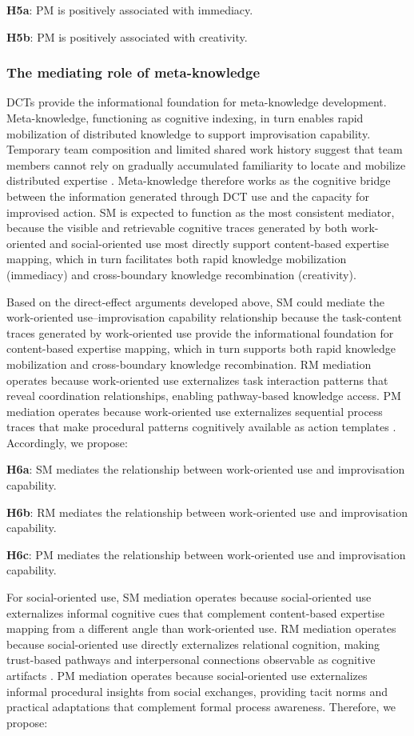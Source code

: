 \documentclass[authoryear,preprint,review,times,10pt]{elsarticle}
\begin{document}
\textbf{H5a}: PM is positively associated with immediacy.

\textbf{H5b}: PM is positively associated with creativity.

\subsubsection{The mediating role of meta-knowledge}
DCTs provide the informational foundation for meta-knowledge development. Meta-knowledge, functioning as cognitive indexing, in turn enables rapid mobilization of distributed knowledge to support improvisation capability. Temporary team composition and limited shared work history suggest that team members cannot rely on gradually accumulated familiarity to locate and mobilize distributed expertise \citep{jiang2025Confronting}. Meta-knowledge therefore works as the cognitive bridge between the information generated through DCT use and the capacity for improvised action. SM is expected to function as the most consistent mediator, because the visible and retrievable cognitive traces generated by both work-oriented and social-oriented use most directly support content-based expertise mapping, which in turn facilitates both rapid knowledge mobilization (immediacy) and cross-boundary knowledge recombination (creativity).

Based on the direct-effect arguments developed above, SM could mediate the work-oriented use--improvisation capability relationship because the task-content traces generated by work-oriented use provide the informational foundation for content-based expertise mapping, which in turn supports both rapid knowledge mobilization and cross-boundary knowledge recombination. RM mediation operates because work-oriented use externalizes task interaction patterns that reveal coordination relationships, enabling pathway-based knowledge access. PM mediation operates because work-oriented use externalizes sequential process traces that make procedural patterns cognitively available as action templates \citep{zhang2018Mobile}. Accordingly, we propose:

\textbf{H6a}: SM mediates the relationship between work-oriented use and improvisation capability.

\textbf{H6b}: RM mediates the relationship between work-oriented use and improvisation capability.

\textbf{H6c}: PM mediates the relationship between work-oriented use and improvisation capability.

For social-oriented use, SM mediation operates because social-oriented use externalizes informal cognitive cues that complement content-based expertise mapping from a different angle than work-oriented use. RM mediation operates because social-oriented use directly externalizes relational cognition, making trust-based pathways and interpersonal connections observable as cognitive artifacts \citep{nisula2016Role}. PM mediation operates because social-oriented use externalizes informal procedural insights from social exchanges, providing tacit norms and practical adaptations that complement formal process awareness. Therefore, we propose:
\end{document}
